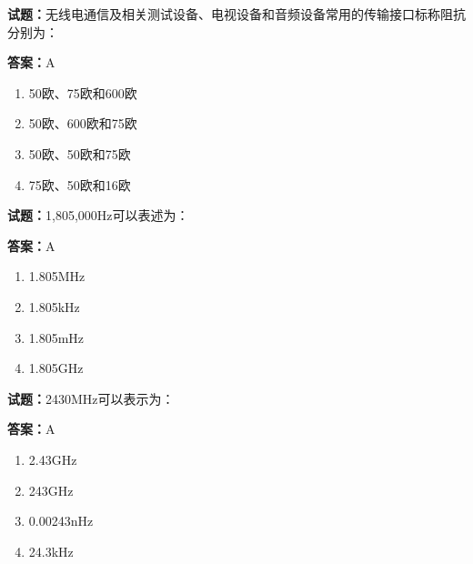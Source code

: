 \documentclass{ctexbook}
\begin{document}




\vspace{1em}

\textbf{试题：}无线电通信及相关测试设备、电视设备和音频设备常用的传输接口标称阻抗分别为： 

\textbf{答案：}A 

\begin{enumerate}[leftmargin=3em]
  \item 50欧、75欧和600欧 

  \item 50欧、600欧和75欧 


  \item 50欧、50欧和75欧 

  \item 75欧、50欧和16欧 

\end{enumerate}





\vspace{1em}

\textbf{试题：}1,805,000Hz可以表述为： 

\textbf{答案：}A 

\begin{enumerate}[leftmargin=3em]
  \item 1.805MHz 

  \item 1.805kHz 

  \item 1.805mHz 

  \item 1.805GHz 

\end{enumerate}





\vspace{1em}

\textbf{试题：}2430MHz可以表示为： 

\textbf{答案：}A 

\begin{enumerate}[leftmargin=3em]
  \item 2.43GHz 

  \item 243GHz 

  \item 0.00243nHz 

  \item 24.3kHz 

\end{enumerate}
\end{document}
